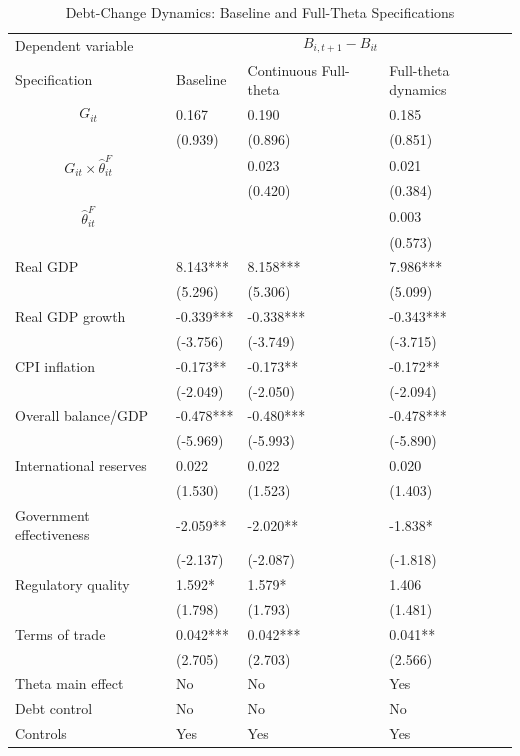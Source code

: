 \begin{table}[H]\centering
\begin{threeparttable}
\caption{Debt-Change Dynamics: Baseline and Full-Theta Specifications}
\label{tab:debt_change_combined_fulltheta}
\scriptsize
\begin{tabularx}{\textwidth}{lYYY}
\toprule
Dependent variable &  \\
\cmidrule(lr){2-4}
Specification & Baseline & Continuous Full-theta & Full-theta dynamics \\
\midrule
$$G_{it}$$ & 0.167 & 0.190 & 0.185 \\
 & (0.939) & (0.896) & (0.851) \\
$$G_{it}\times\widehat{\theta}^{F}_{it}$$ &  & 0.023 & 0.021 \\
 &  & (0.420) & (0.384) \\
$$\widehat{\theta}^{F}_{it}$$ &  &  & 0.003 \\
 &  &  & (0.573) \\
Real GDP & 8.143*** & 8.158*** & 7.986*** \\
 & (5.296) & (5.306) & (5.099) \\
Real GDP growth & -0.339*** & -0.338*** & -0.343*** \\
 & (-3.756) & (-3.749) & (-3.715) \\
CPI inflation & -0.173** & -0.173** & -0.172** \\
 & (-2.049) & (-2.050) & (-2.094) \\
Overall balance/GDP & -0.478*** & -0.480*** & -0.478*** \\
 & (-5.969) & (-5.993) & (-5.890) \\
International reserves & 0.022 & 0.022 & 0.020 \\
 & (1.530) & (1.523) & (1.403) \\
Government effectiveness & -2.059** & -2.020** & -1.838* \\
 & (-2.137) & (-2.087) & (-1.818) \\
Regulatory quality & 1.592* & 1.579* & 1.406 \\
 & (1.798) & (1.793) & (1.481) \\
Terms of trade & 0.042*** & 0.042*** & 0.041** \\
 & (2.705) & (2.703) & (2.566) \\
\midrule
Theta main effect & No & No & Yes \\
Debt control & No & No & No \\
Controls & Yes & Yes & Yes \\

\end{tabularx}
\end{threeparttable}
\end{table}
